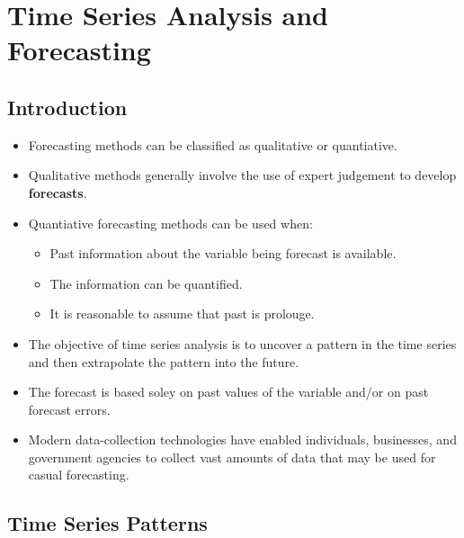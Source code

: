 \documentclass{report}
\begin{document}
\chapter{Time Series Analysis and Forecasting}
\section{Introduction}
\begin{itemize}
  \item Forecasting methods can be classified as qualitative or quantiative.
  \item Qualitative methods generally involve the use of expert judgement to develop \textbf{forecasts}.
  \item Quantiative forecasting methods can be used when:
    \begin{itemize}[label=$\circ$]
      \item Past information about the variable being forecast is available.
      \item The information can be quantified.
      \item It is reasonable to assume that past is prolouge.
    \end{itemize}
  \item The objective of time series analysis is to uncover a pattern in the time series and then extrapolate the pattern into the future.
  \item The forecast is based soley on past values of the variable and/or on past forecast  errors.
  \item Modern data-collection technologies have enabled individuals, businesses, and government agencies to collect vast amounts of data that may be used for casual forecasting.
\end{itemize}
\section{Time Series Patterns}
\end{document}
